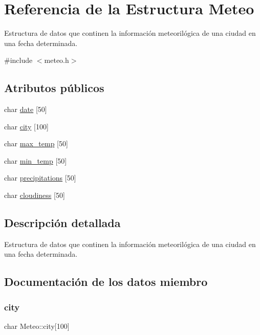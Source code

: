 \hypertarget{struct_meteo}{}\section{Referencia de la Estructura Meteo}
\label{struct_meteo}


Estructura de datos que continen la información meteorilógica de una ciudad en una fecha determinada.  




{\ttfamily \#include $<$meteo.\+h$>$}

\subsection*{Atributos públicos}
\begin{DoxyCompactItemize}
\item 
char \hyperlink{struct_meteo_a1354ca60b1c8eace8abf4ba566136b8b}{date} \mbox{[}50\mbox{]}
\item 
char \hyperlink{struct_meteo_a50e8be1ab49a8cd1578c25febb2402c3}{city} \mbox{[}100\mbox{]}
\item 
char \hyperlink{struct_meteo_aad4188ec453f95ee437ad25a84e16d56}{max\+\_\+temp} \mbox{[}50\mbox{]}
\item 
char \hyperlink{struct_meteo_a1a257a09d4d66da1165856855f2893e3}{min\+\_\+temp} \mbox{[}50\mbox{]}
\item 
char \hyperlink{struct_meteo_ae643bf6c0308de92be1d5500d582cba4}{precipitations} \mbox{[}50\mbox{]}
\item 
char \hyperlink{struct_meteo_a2409c68ef046a6d4e38aeb98b6495a74}{cloudiness} \mbox{[}50\mbox{]}
\end{DoxyCompactItemize}


\subsection{Descripción detallada}
Estructura de datos que continen la información meteorilógica de una ciudad en una fecha determinada. 

\subsection{Documentación de los datos miembro}
\mbox{\label{struct_meteo_a50e8be1ab49a8cd1578c25febb2402c3}} 
\subsubsection{\texorpdfstring{city}{city}}
{\footnotesize\ttfamily char Meteo\+::city\mbox{[}100\mbox{]}}

